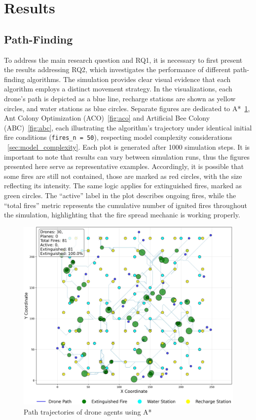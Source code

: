 \documentclass[11pt, a4paper]{article}
\begin{document}
\section{Results}

\subsection{Path-Finding}

To address the main research question and RQ1, it is necessary to first present the results addressing RQ2, which investigates the performance of different path-finding algorithms. The simulation provides clear visual evidence that each algorithm employs a distinct movement strategy. In the visualizations, each drone’s path is depicted as a blue line, recharge stations are shown as yellow circles, and water stations as blue circles. Separate figures are dedicated to A*~\ref{fig:a_star}, Ant Colony Optimization (ACO)~\ref{fig:aco} and Artificial Bee Colony (ABC)~\ref{fig:abc}, each illustrating the algorithm’s trajectory under identical initial fire conditions (\texttt{fires\_n = 50}), respecting model complexity considerations ~\ref{sec:model_complexity}. Each plot is generated after 1000 simulation steps.
It is important to note that results can vary between simulation runs, thus the figures presented here serve as representative examples. Accordingly, it is possible that some fires are still not contained, those are marked as red circles, with the size reflecting its intensity. The same logic applies for extinguished fires, marked as green circles.
The ``active'' label in the plot describes ongoing fires, while the ``total fires'' metric represents the cumulative number of ignited fires throughout the simulation, highlighting that the fire spread mechanic is working properly.

\begin{figure}[htbp]
    \centering
    \includegraphics[width=1\linewidth]{figures/A*_agent_paths.jpeg}
    \caption{Path trajectories of drone agents using A*}
    \label{fig:a_star}
\end{figure}
\end{document}
